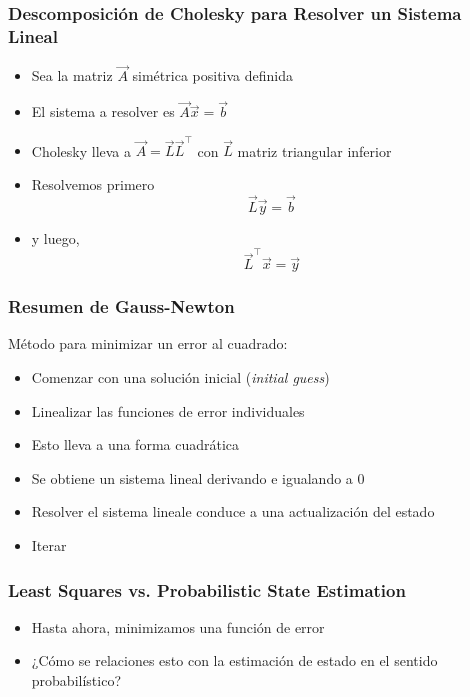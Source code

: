 \begin{frame}
    \frametitle{Descomposición de Cholesky para Resolver un Sistema Lineal}
    
    \begin{itemize}
        \item Sea la matriz $\vec{A}$ simétrica positiva definida
        \item El sistema a resolver es $\vec{A} \vec{x} = \vec{b}$
        \item Cholesky lleva a $\vec{A} = \vec{L} \vec{L}^{\top}$ con $\vec{L}$ matriz triangular inferior
        \item<2> Resolvemos primero
        \begin{equation*}
            \vec{L} \vec{y} = \vec{b}
        \end{equation*}
        \item<2> y luego,
        \begin{equation*}
            \vec{L}^{\top} \vec{x} = \vec{y}
        \end{equation*}
    
    \end{itemize}
    
\end{frame}

\begin{frame}
    \frametitle{Resumen de Gauss-Newton}
    
    Método para minimizar un error al cuadrado:
    \begin{itemize} 
        \item Comenzar con una solución inicial (\emph{initial guess})
        \item Linealizar las funciones de error individuales
        \item Esto lleva a una forma cuadrática
        \item Se obtiene un sistema lineal derivando e igualando a 0
        \item Resolver el sistema lineale conduce a una actualización del estado
        \item Iterar
    \end{itemize}
    
\end{frame}

\begin{frame}
    \frametitle{Least Squares vs. Probabilistic State Estimation}
    
    \begin{itemize}
        \item Hasta ahora, minimizamos una función de error
        \item ¿Cómo se relaciones esto con la estimación de estado en el sentido probabilístico?
    \end{itemize}
    
\end{frame}

